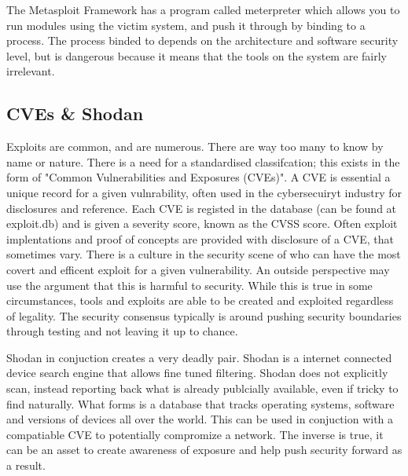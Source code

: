 The Metasploit Framework has a program called meterpreter which allows you to run modules using the victim system, and push it through by binding to a process. The process binded to depends on the architecture and software security level, but is dangerous
because it means that the tools on the system are fairly irrelevant. 

\subsection{CVEs \& Shodan}
Exploits are common, and are numerous. There are way too many to know by name or nature. There is a need for a standardised classifcation; this exists in the form of "Common Vulnerabilities and Exposures (CVEs)". A CVE is essential a unique record for a given vulnrability,
often used in the cybersecuiryt industry for disclosures and reference. Each CVE is registed in the database (can be found at exploit.db) and is given a severity score, known as the CVSS score. Often exploit implentations and proof of concepts are provided with disclosure of a CVE, that sometimes vary.
There is a culture in the security scene of who can have the most covert and efficent exploit for a given vulnerability. An outside perspective may use the argument that this is harmful to security. While this is true in some circumstances, tools and exploits are able to be created and exploited regardless of legality.
The security consensus typically is around pushing security boundaries through testing and not leaving it up to chance. 


Shodan in conjuction creates a very deadly pair. Shodan is a internet connected device search engine that allows fine tuned filtering.
Shodan does not explicitly scan, instead reporting back what is already publcially available, even if tricky to find naturally. What forms is a database that 
tracks operating systems, software and versions of devices all over the world. This can be used in conjuction with a compatiable CVE to potentially compromize a network.
The inverse is true, it can be an asset to create awareness of exposure and help push security forward as a result.


